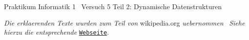 Praktikum Informatik 1~\newline
Versuch 5 Teil 2\+: Dynamische Datenstrukturen

{\itshape Die erklaerenden Texte wurden zum Teil von} wikipedia.\+org {\itshape uebernommen}~\newline
{\itshape Siehe hierzu die entsprechende} \href{https://en.wikipedia.org/wiki/Stack_(abstract_data_type)}{\tt Webseite}. 